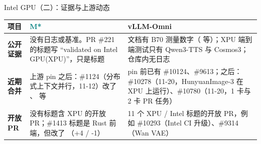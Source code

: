 \begin{frame}[t]{Intel GPU（二）：证据与上游动态}
\scriptsize\def\codesize{\relax}
\renewcommand{\arraystretch}{1.12}
\setlength{\tabcolsep}{3pt}
\begin{tabularx}{\textwidth}{>{\bfseries}p{2.1cm} Y Y}
\toprule
{}
项目 & \textcolor{Teal}{M*} & vLLM-Omni \\
\midrule
公开证据 & 没有日志或基准。PR \#221 的标题写 “validated on Intel GPU(XPU)”，只是标题 & 文档有 B70 测量数字（ 等）；XPU 端到端测试只有 Qwen3-TTS 与 Cosmos3；仓库内无日志 \\
近期合并 & 上游 pin 之后：\#1124（分布式上下文并行，11-12）改了 、 等 & pin 前已有 \#10124、\#9613；之后：\#10278（11-20，HunyuanImage-3 在 XPU 上运行）、\#10780（11-20，1 卡与 2 卡 PR 任务） \\
开放 PR & 没有标题含 XPU 的开放 PR；\#1413 标题是 Rust 前端，但改了 （+4 / -1） & 11 个 XPU / Intel 标题的开放 PR，例如 \#10293（Intel CI 升级）、\#9314（Wan VAE） \\
\bottomrule
\end{tabularx}
\end{frame}

